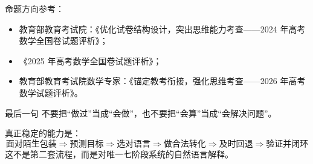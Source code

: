 \documentclass[11pt,a4paper]{ctexart}
\begin{document}
命题方向参考：
\begin{itemize}
  \item 教育部教育考试院：《优化试卷结构设计，突出思维能力考查——2024 年高考数学全国卷试题评析》；
  \item 《2025 年高考数学全国卷试题评析》；
  \item 教育部教育考试院数学专家：《锚定教考衔接，强化思维考查——2026 年高考数学试题评析》。
\end{itemize}

\begin{corebox}{最后一句}
不要把“做过”当成“会做”，也不要把“会算”当成“会解决问题”。

真正稳定的能力是：
\[
\boxed{
\text{面对陌生包装}
\Rightarrow
\text{预测目标}
\Rightarrow
\text{选对语言}
\Rightarrow
\text{做合法转化}
\Rightarrow
\text{及时回退}
\Rightarrow
\text{验证并闭环}}
\]
这不是第二套流程，而是对唯一七阶段系统的自然语言解释。
\end{corebox}
\end{document}
